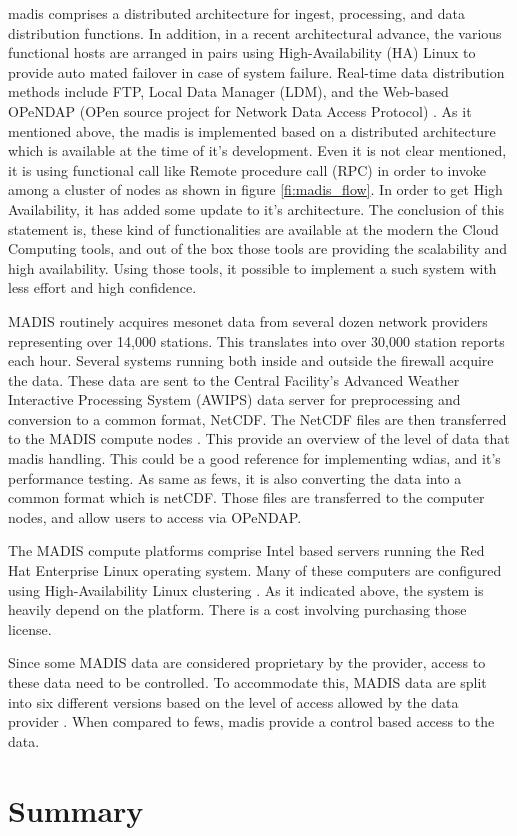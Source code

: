 \acrshort{madis} comprises a distributed architecture for ingest, processing, and data distribution functions.
In addition, in a recent architectural advance, the various functional hosts are arranged in pairs using High-Availability (HA) Linux to provide auto mated failover in case of system failure. Real-time data distribution methods include FTP, Local Data Manager (LDM), and the Web-based OPeNDAP (OPen source project for Network Data Access Protocol) \cite{Macdermaid2005ARCHITECTUREP2.39}. As it mentioned above, the \acrshort{madis} is implemented based on a distributed architecture which is available at the time of it's development. Even it is not clear mentioned, it is using functional call like Remote procedure call (RPC) in order to invoke among a cluster of nodes as shown in figure \ref{fi:madis_flow}. In order to get High Availability, it has added some update to it's architecture. The conclusion of this statement is, these kind of functionalities are available at the modern the Cloud Computing tools, and out of the box those tools are providing the scalability and high availability. Using those tools, it possible to implement a such system with less effort and high confidence.

MADIS routinely acquires mesonet data from several dozen network providers representing over 14,000 stations. This translates into over 30,000 station reports each hour. Several systems running both inside and outside the firewall acquire the data. These data are sent to the Central Facility's Advanced Weather Interactive Processing System (AWIPS) data server for preprocessing and conversion to a common format, NetCDF. The NetCDF files are then transferred to the MADIS compute nodes \cite{Macdermaid2005ARCHITECTUREP2.39}. This provide an overview of the level of data that \acrshort{madis} handling. This could be a good reference for implementing \acrshort{wdias}, and it's performance testing. As same as \acrshort{fews}, it is also converting the data into a common format which is \acrshort{netCDF}. Those files are transferred to the computer nodes, and allow users to access via OPeNDAP.

The MADIS compute platforms comprise Intel based servers running the Red Hat Enterprise Linux operating system. Many of these computers are configured using High-Availability Linux clustering \cite{Macdermaid2005ARCHITECTUREP2.39}. As it indicated above, the system is heavily depend on the platform. There is a cost involving purchasing those license.

Since some MADIS data are considered proprietary by the provider, access to these data need to be controlled. To accommodate this, MADIS data are split into six different versions based on the level of access allowed by the data provider \cite{Macdermaid2005ARCHITECTUREP2.39}. When compared to \acrshort{fews}, \acrshort{madis} provide a control based access to the data.

\section{Summary}
\label{se:lit_summary}
